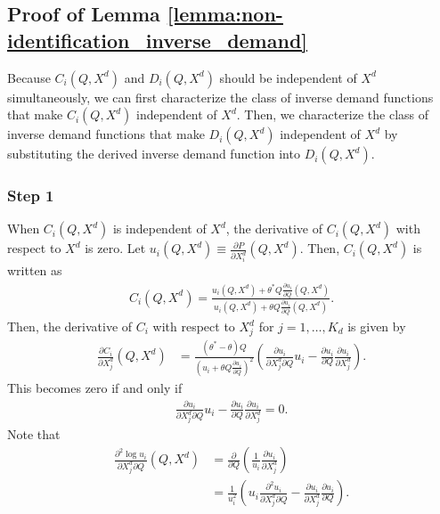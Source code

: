 \documentclass[11pt, a4paper]{article}
\theoremstyle{remark}
\begin{document}
\subsection{Proof of Lemma \ref{lemma:non-identification_inverse_demand}}


Because $C_i(Q, X^{d})$ and $D_i(Q, X^{d})$ should be independent of $X^{d}$ simultaneously, we can first characterize the class of inverse demand functions that make $C_i(Q, X^{d})$ independent of $X^{d}$.
Then, we characterize the class of inverse demand functions that make $D_i(Q, X^{d})$ independent of $X^{d}$ by substituting the derived inverse demand function into $D_i(Q, X^{d})$.


\subsubsection*{Step 1}
When $C_i(Q, X^{d})$ is independent of $X^{d}$, the derivative of $C_i(Q, X^{d})$ with respect to $X^{d}$ is zero.
Let $u_i(Q, X^{d}) \equiv \frac{\partial P}{\partial X^{d}_i}(Q, X^{d})$.
Then, $C_i(Q, X^{d})$ is written as
\begin{align}
    C_i(Q, X^{d}) = \frac{u_i(Q, X^{d}) + \theta^{*} Q \frac{\partial u_i}{\partial Q}(Q, X^{d})}{ u_i(Q, X^{d}) + \theta Q \frac{\partial u_i}{\partial Q}(Q, X^{d})}.
\end{align}
Then, the derivative of $C_i$ with respect to $X^{d}_j$ for $j = 1, \ldots, K_d$ is given by
\begin{align}
    \frac{\partial C_i}{\partial X^{d}_j}(Q, X^{d}) & = \frac{(\theta^{*} - \theta)Q }{\left(u_i + \theta Q \frac{\partial u_i}{\partial Q}\right)^2}\left(\frac{\partial u_i}{\partial X^{d}_j\partial Q} u_i - \frac{\partial u_i}{\partial Q} \frac{\partial u_i}{\partial X^{d}_j}\right).
\end{align}
This becomes zero if and only if
\begin{align}
    \frac{\partial u_i}{\partial X^{d}_j\partial Q} u_i - \frac{\partial u_i}{\partial Q} \frac{\partial u_i}{\partial X^{d}_j} = 0.
\end{align}
Note that 
\begin{align}
    \frac{\partial^2 \log u_i}{\partial X^{d}_j \partial Q}(Q, X^{d}) & = \frac{\partial }{\partial Q}\left(\frac{1}{u_i}\frac{\partial u_i}{\partial X^{d}_j}\right)\\
    & = \frac{1}{u_i^2}\left(u_i\frac{\partial^2 u_i}{\partial X^{d}_j \partial Q} - \frac{\partial u_i}{\partial X^{d}_j}\frac{\partial u_i}{\partial Q}\right).
\end{align}
\end{document}
